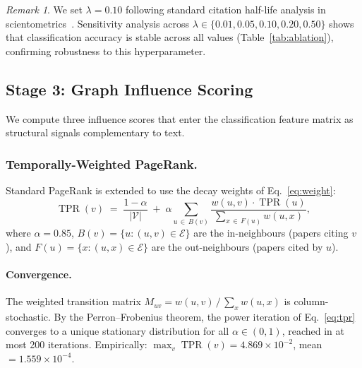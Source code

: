 \documentclass[letterpaper]{article}
\theoremstyle{plain}
\theoremstyle{definition}
\theoremstyle{remark}
\newtheorem{remark}{Remark}
\newcommand{\V}{\mathcal{V}}
\newcommand{\E}{\mathcal{E}}
\newcommand{\lam}{\lambda}
\newcommand{\tpr}[1]{\operatorname{TPR}(#1)}
\newcommand{\Bin}[1]{B(#1)}
\newcommand{\Fout}[1]{F(#1)}
\begin{document}
\begin{remark}
We set $\lam = 0.10$ following standard citation half-life
analysis in scientometrics~\cite{price1965}.
Sensitivity analysis across
$\lam \in \{0.01, 0.05, 0.10, 0.20, 0.50\}$
shows that classification accuracy is stable across all values
(Table~\ref{tab:ablation}), confirming robustness to this
hyperparameter.
\end{remark}

\subsection{Stage 3: Graph Influence Scoring}
\label{sec:influence}

We compute three influence scores that enter the classification
feature matrix as structural signals complementary to text.

\subsubsection{Temporally-Weighted PageRank.}
Standard PageRank is extended to use the decay weights
of Eq.~\eqref{eq:weight}:
\begin{equation}
    \tpr{v}
    \;=\;
    \frac{1-\alpha}{|\V|}
    \;+\;
    \alpha
    \sum_{u \,\in\, \Bin{v}}
    \frac{w(u,v)\cdot\tpr{u}}%
         {\displaystyle\sum_{x \,\in\, \Fout{u}} w(u,x)},
    \label{eq:tpr}
\end{equation}
where $\alpha = 0.85$,
$\Bin{v} = \{u : (u,v)\in\E\}$ are the in-neighbours
(papers citing $v$), and
$\Fout{u} = \{x : (u,x)\in\E\}$ are the out-neighbours
(papers cited by $u$).

\paragraph{Convergence.}
The weighted transition matrix
$M_{uv} = w(u,v)\,/\,\sum_x w(u,x)$
is column-stochastic.
By the Perron--Frobenius theorem, the power iteration of
Eq.~\eqref{eq:tpr} converges to a unique stationary
distribution for all $\alpha \in (0,1)$,
reached in at most 200 iterations.
Empirically: $\max_v \tpr{v} = 4.869 \times 10^{-2}$,
mean $= 1.559 \times 10^{-4}$.
\end{document}
